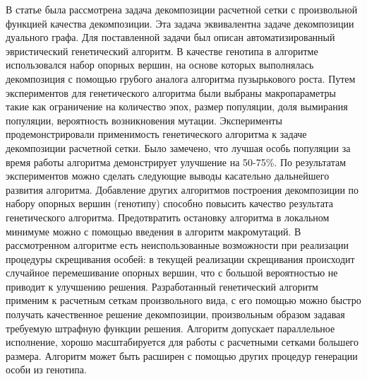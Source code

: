 В статье была рассмотрена задача декомпозиции расчетной сетки с произвольной функцией качества декомпозиции.
Эта задача эквивалентна задаче декомпозиции дуального графа.
Для поставленной задачи был описан автоматизированный эвристический генетический алгоритм.
В качестве генотипа в алгоритме использовался набор опорных вершин, на основе которых выполнялась декомпозиция с помощью грубого аналога алгоритма пузырькового роста.
Путем экспериментов для генетического алгоритма были выбраны макропараметры такие как ограничение на количество эпох, размер популяции, доля вымирания популяции, вероятность возникновения мутации.
Эксперименты продемонстрировали применимость генетического алгоритма к задаче декомпозиции расчетной сетки. Было замечено, что лучшая особь популяции за время работы алгоритма демонстрирует улучшение на 50-75\%. 
По результатам экспериментов можно сделать следующие выводы касательно дальнейшего развития алгоритма.
Добавление других алгоритмов построения декомпозиции по набору опорных вершин (генотипу) способно повысить качество результата генетического алгоритма.
Предотвратить остановку алгоритма в локальном минимуме можно с помощью введения в алгоритм макромутаций.
В рассмотренном алгоритме есть неиспользованные возможности при реализации процедуры скрещивания особей: в текущей реализации скрещивания происходит случайное перемешивание опорных вершин, что с большой вероятностью не приводит к улучшению решения.
Разработанный генетический алгоритм применим к расчетным сеткам произвольного вида, с его помощью можно быстро получать качественное решение декомпозиции, произвольным образом задавая требуемую штрафную функции решения.
Алгоритм допускает параллельное исполнение, хорошо масштабируется для работы с расчетными сетками большего размера.
Алгоритм может быть расширен с помощью других процедур генерации особи из генотипа.
